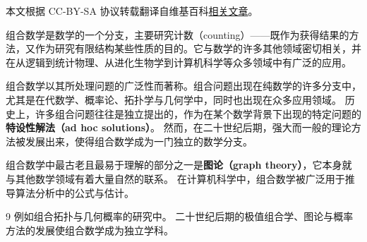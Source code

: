 
本文根据 CC-BY-SA 协议转载翻译自维基百科\href{https://en.wikipedia.org/wiki/Combinatorics}{相关文章}。

组合数学是数学的一个分支，主要研究计数（counting）——既作为获得结果的方法，又作为研究有限结构某些性质的目的。它与数学的许多其他领域密切相关，并在从逻辑到统计物理、从进化生物学到计算机科学等众多领域中有广泛的应用。

组合数学以其所处理问题的广泛性而著称。组合问题出现在纯数学的许多分支中，尤其是在代数学、概率论、拓扑学与几何学中\cite{ref1}，同时也出现在众多应用领域。  
历史上，许多组合问题往往是独立提出的，作为在某个数学背景下出现的特定问题的\textbf{特设性解法（ad hoc solutions）}。  
然而，在二十世纪后期，强大而一般的理论方法被发展出来，使得组合数学成为一门独立的数学分支\cite{ref2}。

组合数学中最古老且最易于理解的部分之一是\textbf{图论（graph theory）}，它本身就与其他数学领域有着大量自然的联系。  
在计算机科学中，组合数学被广泛用于推导算法分析中的公式与估计。

\begin{thebibliography}{9}
 例如组合拓扑与几何概率的研究中。
 二十世纪后期的极值组合学、图论与概率方法的发展使组合数学成为独立学科。
\end{thebibliography}
